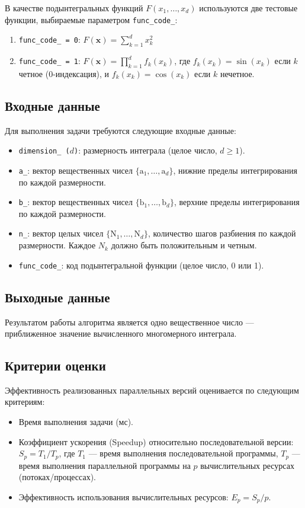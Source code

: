 \documentclass[a4paper,12pt]{article}
\begin{document}
В качестве подынтегральных функций $F(x_1, \dots, x_d)$ используются две тестовые функции, выбираемые параметром \texttt{func\_code\_}:
\begin{enumerate}
    \item \texttt{func\_code\_ = 0}: $F(\mathbf{x}) = \sum_{k=1}^{d} x_k^2$
    \item \texttt{func\_code\_ = 1}: $F(\mathbf{x}) = \prod_{k=1}^{d} f_k(x_k)$, где $f_k(x_k) = \sin(x_k)$ если $k$ четное (0-индексация), и $f_k(x_k) = \cos(x_k)$ если $k$ нечетное.
\end{enumerate}

\subsection{Входные данные}
\label{ssec:input_data}
Для выполнения задачи требуются следующие входные данные:
\begin{itemize}
    \item \texttt{dimension\_ ($d$)}: размерность интеграла (целое число, $d \ge 1$).
    \item \texttt{a\_}: вектор вещественных чисел $\{\text{a}_1, \dots, \text{a}_d\}$, нижние пределы интегрирования по каждой размерности.
    \item \texttt{b\_}: вектор вещественных чисел $\{\text{b}_1, \dots, \text{b}_d\}$, верхние пределы интегрирования по каждой размерности.
    \item \texttt{n\_}: вектор целых чисел $\{\text{N}_1, \dots, \text{N}_d\}$, количество шагов разбиения по каждой размерности. Каждое $N_k$ должно быть положительным и четным.
    \item \texttt{func\_code\_}: код подынтегральной функции (целое число, 0 или 1).
\end{itemize}

\subsection{Выходные данные}
\label{ssec:output_data}
Результатом работы алгоритма является одно вещественное число — приближенное значение вычисленного многомерного интеграла.

\subsection{Критерии оценки}
\label{ssec:evaluation_criteria}
Эффективность реализованных параллельных версий оценивается по следующим критериям:
\begin{itemize}
    \item Время выполнения задачи (мс).
    \item Коэффициент ускорения (Speedup) относительно последовательной версии: $S_p = T_1 / T_p$, где $T_1$ — время выполнения последовательной программы, $T_p$ — время выполнения параллельной программы на $p$ вычислительных ресурсах (потоках/процессах).
    \item Эффективность использования вычислительных ресурсов: $E_p = S_p / p$.
\end{itemize}
\end{document}
